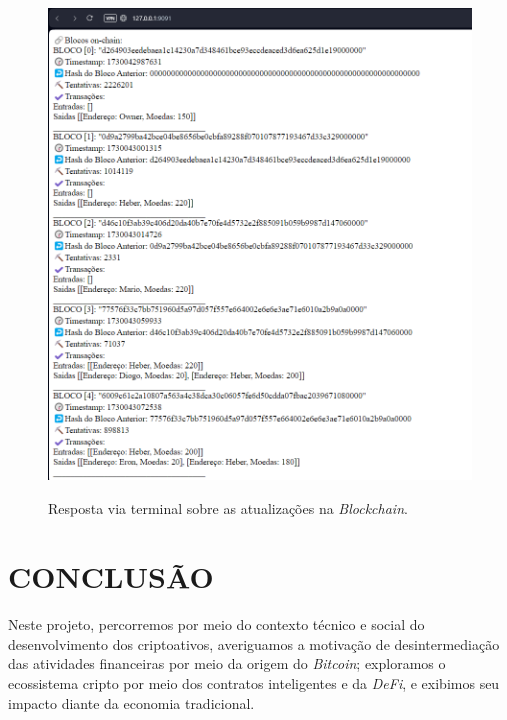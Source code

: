 \documentclass[article,12pt,oneside,a4paper,english,brazil]{unifil}
\begin{document}
\begin{Spacing}{1.5}
\begin{figure} [h]
	\centering
	\caption{Resposta via terminal sobre as atualizações na \textit{Blockchain}.}
	\includegraphics[width=1\linewidth]{../images/navegador-blockchain.png}
	\label{fig:navegador}

\end{figure}
\clearpage


% 


\section*{CONCLUSÃO}

Neste projeto, percorremos por meio do contexto técnico e social do desenvolvimento dos criptoativos, averiguamos a motivação de desintermediação das atividades financeiras por meio da origem do \textit{Bitcoin}; exploramos o ecossistema cripto por meio dos contratos inteligentes e da \textit{DeFi}, e exibimos seu impacto diante da economia tradicional.


\end{Spacing}
\end{document}
